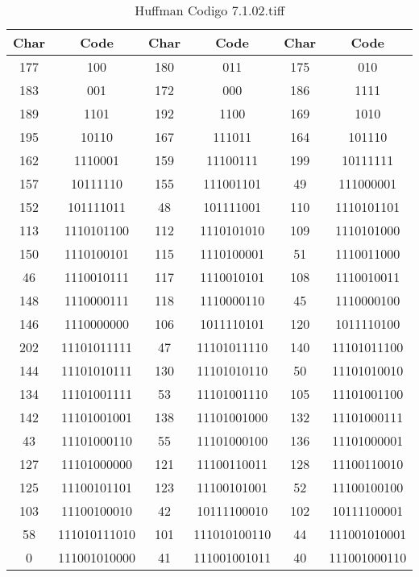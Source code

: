 \documentclass[conference,onecolumn,12pt]{IEEEtran}
\numberwithin{equation}{subsection}
\begin{document}
\begin{table}[H]
\centering
\caption{Huffman Codigo 7.1.02.tiff}
\label{tab:compression_tiff}
\begin{tabular}{|c|c||c|c||c|c|}
\hline
\textbf{Char} & \textbf{Code} & \textbf{Char} & \textbf{Code} & \textbf{Char} & \textbf{Code} \\
\hline
177 & 100 & 180 & 011 & 175 & 010 \\
183 & 001 & 172 & 000 & 186 & 1111 \\
189 & 1101 & 192 & 1100 & 169 & 1010 \\
195 & 10110 & 167 & 111011 & 164 & 101110 \\
162 & 1110001 & 159 & 11100111 & 199 & 10111111 \\
157 & 10111110 & 155 & 111001101 & 49 & 111000001 \\
152 & 101111011 & 48 & 101111001 & 110 & 1110101101 \\
113 & 1110101100 & 112 & 1110101010 & 109 & 1110101000 \\
150 & 1110100101 & 115 & 1110100001 & 51 & 1110011000 \\
46 & 1110010111 & 117 & 1110010101 & 108 & 1110010011 \\
148 & 1110000111 & 118 & 1110000110 & 45 & 1110000100 \\
146 & 1110000000 & 106 & 1011110101 & 120 & 1011110100 \\
202 & 11101011111 & 47 & 11101011110 & 140 & 11101011100 \\
144 & 11101010111 & 130 & 11101010110 & 50 & 11101010010 \\
134 & 11101001111 & 53 & 11101001110 & 105 & 11101001100 \\
142 & 11101001001 & 138 & 11101001000 & 132 & 11101000111 \\
43 & 11101000110 & 55 & 11101000100 & 136 & 11101000001 \\
127 & 11101000000 & 121 & 11100110011 & 128 & 11100110010 \\
125 & 11100101101 & 123 & 11100101001 & 52 & 11100100100 \\
103 & 11100100010 & 42 & 10111100010 & 102 & 10111100001 \\
58 & 111010111010 & 101 & 111010100110 & 44 & 111001010001 \\
0 & 111001010000 & 41 & 111001001011 & 40 & 111001000110 \\
\hline
\end{tabular}
\end{table}
\end{document}
